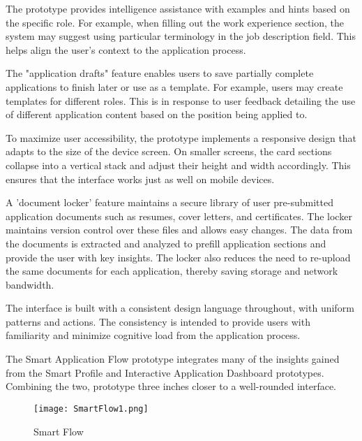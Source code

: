 \documentclass[
	letterpaper, %
]{jdf}
\begin{document}
The prototype provides intelligence assistance with examples and hints based on the specific role. For example, when filling out the work experience section, the system may suggest using particular terminology in the job description field. This helps align the user's context to the application process.

The "application drafts" feature enables users to save partially complete applications to finish later or use as a template. For example, users may create templates for different roles. This is in response to user feedback detailing the use of different application content based on the position being applied to.

To maximize user accessibility, the prototype implements a responsive design that adapts to the size of the device screen. On smaller screens, the card sections collapse into a vertical stack and adjust their height and width accordingly. This ensures that the interface works just as well on mobile devices.

A 'document locker' feature maintains a secure library of user pre-submitted application documents such as resumes, cover letters, and certificates. The locker maintains version control over these files and allows easy changes. The data from the documents is extracted and analyzed to prefill application sections and provide the user with key insights. The locker also reduces the need to re-upload the same documents for each application, thereby saving storage and network bandwidth.

The interface is built with a consistent design language throughout, with uniform patterns and actions. The consistency is intended to provide users with familiarity and minimize cognitive load from the application process.

The Smart Application Flow prototype integrates many of the insights gained from the Smart Profile and Interactive Application Dashboard prototypes. Combining the two, prototype three inches closer to a well-rounded interface. 

\begin{figure}
    \centering
    \texttt{[image: SmartFlow1.png]}
    \caption{Smart Flow}
    \label{fig:enter-label}
\end{figure}
\end{document}
